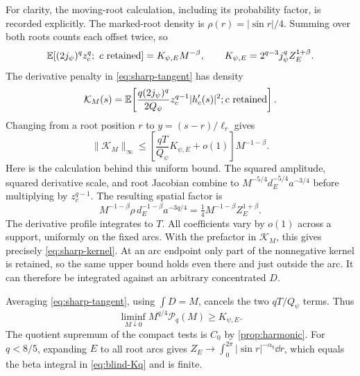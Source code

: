 For clarity, the moving-root calculation, including its probability
factor, is recorded explicitly. The marked-root density is
$\rho(r)=|\sin r|/4$. Summing over both roots counts each offset
twice, so
\begin{equation}\label{eq:sharp-reference-average}
 \mathbb E[(2j_\psi)^qz_c^q;\ c\text{ retained}]
 =K_{\psi,E}M^{-\beta},\qquad
 K_{\psi,E}=2^{q-3}j_\psi^qZ_E^{1+\beta}.
\end{equation}
The derivative penalty in \eqref{eq:sharp-tangent} has density
\[
 \mathcal K_M(s)=\mathbb E\!\left[
 \frac{q(2j_\psi)^q}{2Q_\psi}z_c^{q-1}|h_c'(s)|^2;
 c\text{ retained}\right].
\]
Changing from a root position $r$ to $y=(s-r)/\ell_r$ gives
\begin{equation}\label{eq:sharp-kernel}
 \|\mathcal K_M\|_\infty
 \le\left[\frac{qT}{Q_\psi}K_{\psi,E}+o(1)\right]M^{-1-\beta}.
\end{equation}
Here is the calculation behind this uniform bound. The squared
amplitude, squared derivative scale, and root Jacobian combine to
$M^{-5/4}d_E^{-5/4}a^{-3/4}$ before multiplying by
$z_c^{q-1}$. The resulting spatial factor is
\[
 M^{-1-\beta}\rho\,d_E^{-1-\beta}a^{-3q/4}
   =\tfrac14M^{-1-\beta}Z_E^{1+\beta}.
\]
The derivative profile integrates to $T$. All coefficients vary by
$o(1)$ across a support, uniformly on the fixed arcs. With the
prefactor in $\mathcal K_M$, this gives precisely
\eqref{eq:sharp-kernel}. At an arc endpoint only part of the
nonnegative kernel is retained, so the same upper bound holds even
there and just outside the arc. It can therefore be integrated
against an arbitrary concentrated $D$.

Averaging \eqref{eq:sharp-tangent}, using $\int D=M$, cancels the two
$qT/Q_\psi$ terms. Thus
\begin{equation}\label{eq:sharp-liminf}
 \liminf_{M\downarrow0}M^{q/4}\mathcal P_q(M)\ge K_{\psi,E}.
\end{equation}
The quotient supremum of the compact tests is $C_0$ by
\cref{prop:harmonic}. For $q<8/5$, expanding $E$ to all root arcs
gives $Z_E\to\int_0^{2\pi}|\sin r|^{-\alpha_q}\dd r$, which equals
the beta integral in \eqref{eq:blind-Kq} and is finite.

